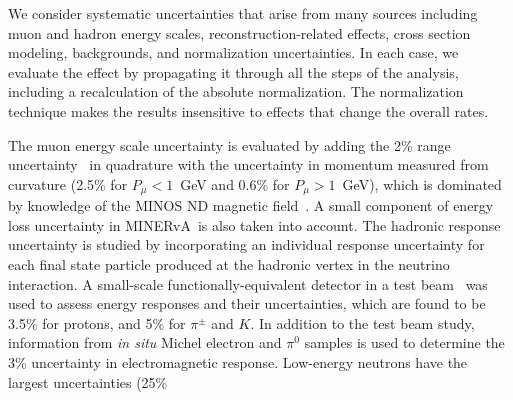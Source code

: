 \documentclass[aps,preprint,showpacs,superscriptaddress,linenumbers,nofootinbib,prd,12pt]{revtex4}
\newcommand{\minerva}{MINERvA\xspace}
\begin{document}
We consider systematic uncertainties that arise from many sources including
muon and hadron energy scales, reconstruction-related effects, cross section modeling,
backgrounds, and normalization uncertainties.
In each case, we evaluate the effect by propagating it 
through all the steps of the analysis, including a recalculation of the absolute normalization.
The normalization technique makes the results insensitive to effects that change the overall rates.

The muon energy scale uncertainty is 
evaluated by adding the 2\% range uncertainty~\cite{Michael:2008bc}  in quadrature 
with the uncertainty in momentum measured from curvature
(2.5\% for $P_{\mu}<1$~GeV and 0.6\% for $P_{\mu}>1$~GeV), which is dominated by 
knowledge of the MINOS ND magnetic field~\cite{minervanim}.
A small component of energy loss uncertainty in \minerva\ is also taken into account. 
The hadronic response uncertainty is studied by 
incorporating an individual response uncertainty for each final state particle produced 
at the hadronic vertex in the neutrino interaction. 
A small-scale functionally-equivalent detector in a test beam~\cite{Aliaga:2015aqe} was used to assess energy responses and their uncertainties, which are found to be 3.5\% for protons, and 5\% for  $\pi^{\pm}$ and $K$.
In addition to the test beam study, information from {\it in situ} Michel electron and $\pi^0$ samples is used to 
determine the 3\% uncertainty in electromagnetic response. 
Low-energy neutrons have the largest uncertainties (25\%
\end{document}
